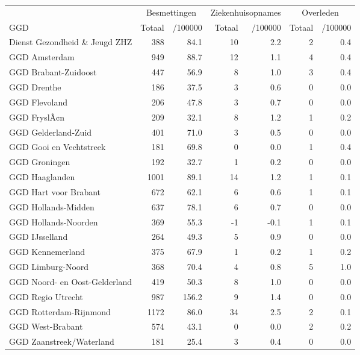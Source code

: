 \documentclass[
  english,
  man,floatsintext]{apa6}
\begin{document}
\begin{table}
\centering\begingroup\fontsize{10}{12}\selectfont

\begin{threeparttable}
\begin{tabular}{lrrrrrr}
\toprule
\multicolumn{1}{c}{ } & \multicolumn{2}{c}{Besmettingen} & \multicolumn{2}{c}{Ziekenhuisopnames} & \multicolumn{2}{c}{Overleden} \\
\cmidrule(l{3pt}r{3pt}){2-3} \cmidrule(l{3pt}r{3pt}){4-5} \cmidrule(l{3pt}r{3pt}){6-7}
GGD & Totaal & /100000 & Totaal & /100000 & Totaal & /100000\\
\midrule
Dienst Gezondheid \& Jeugd ZHZ & 388 & 84.1 & 10 & 2.2 & 2 & 0.4\\
GGD Amsterdam & 949 & 88.7 & 12 & 1.1 & 4 & 0.4\\
GGD Brabant-Zuidoost & 447 & 56.9 & 8 & 1.0 & 3 & 0.4\\
GGD Drenthe & 186 & 37.5 & 3 & 0.6 & 0 & 0.0\\
GGD Flevoland & 206 & 47.8 & 3 & 0.7 & 0 & 0.0\\
GGD FryslÃ¢n & 209 & 32.1 & 8 & 1.2 & 1 & 0.2\\
GGD Gelderland-Zuid & 401 & 71.0 & 3 & 0.5 & 0 & 0.0\\
GGD Gooi en Vechtstreek & 181 & 69.8 & 0 & 0.0 & 1 & 0.4\\
GGD Groningen & 192 & 32.7 & 1 & 0.2 & 0 & 0.0\\
GGD Haaglanden & 1001 & 89.1 & 14 & 1.2 & 1 & 0.1\\
GGD Hart voor Brabant & 672 & 62.1 & 6 & 0.6 & 1 & 0.1\\
GGD Hollands-Midden & 637 & 78.1 & 6 & 0.7 & 0 & 0.0\\
GGD Hollands-Noorden & 369 & 55.3 & -1 & -0.1 & 1 & 0.1\\
GGD IJsselland & 264 & 49.3 & 5 & 0.9 & 0 & 0.0\\
GGD Kennemerland & 375 & 67.9 & 1 & 0.2 & 1 & 0.2\\
GGD Limburg-Noord & 368 & 70.4 & 4 & 0.8 & 5 & 1.0\\
GGD Noord- en Oost-Gelderland & 419 & 50.3 & 8 & 1.0 & 0 & 0.0\\
GGD Regio Utrecht & 987 & 156.2 & 9 & 1.4 & 0 & 0.0\\
GGD Rotterdam-Rijnmond & 1172 & 86.0 & 34 & 2.5 & 2 & 0.1\\
GGD West-Brabant & 574 & 43.1 & 0 & 0.0 & 2 & 0.2\\
GGD Zaanstreek/Waterland & 181 & 25.4 & 3 & 0.4 & 0 & 0.0\\

\end{tabular}
\end{threeparttable}
\end{table}
\end{document}
